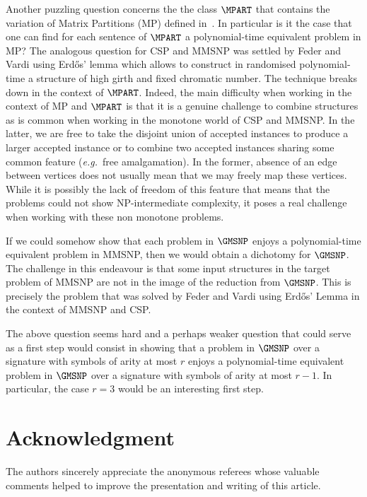 \documentclass{lmcs}
\def\eg{{\em e.g.}}
\begin{document}
Another puzzling question concerns the the class $\MPART$ that contains the variation of Matrix Partitions (MP) defined in~\cite{barsukovkante}.
%
In particular is it the case that one can find for each sentence of $\MPART$ a polynomial-time equivalent problem in MP?
%
The analogous question for CSP and MMSNP was settled by Feder and Vardi using Erd\H{o}s' lemma which allows to construct in randomised polynomial-time a structure of high girth and fixed chromatic number. 
%
The technique breaks down in the context of $\MPART$.
%
Indeed, the main difficulty when working in the context of MP and $\MPART$ is that it is a genuine challenge to combine structures as is common when working in the monotone world of CSP and MMSNP. 
%
In the latter, we are free to take the disjoint union of accepted instances to produce a larger accepted instance or to combine two accepted instances sharing some common feature (\eg~free amalgamation). 
%
In the former, absence of an edge between vertices does not usually mean that we may freely map these vertices.
%
While it is possibly the lack of freedom of this feature that means that the problems could not show NP-intermediate complexity, it poses a real challenge when working with these non monotone problems.

If we could somehow show that each problem in  $\GMSNP$ enjoys a polynomial-time equivalent problem in MMSNP, then we would obtain a dichotomy for $\GMSNP$.
%
The challenge in this endeavour is that some input structures in the target problem of MMSNP are not in the image of the reduction from $\GMSNP$. 
%
This is precisely the problem that was solved by Feder and Vardi using Erd\H{o}s' Lemma in the context of MMSNP and CSP.  

The above question seems hard and a perhaps weaker question that could serve as a first step would consist in showing that a problem in $\GMSNP$ over a signature with symbols of arity at most $r$ enjoys a polynomial-time equivalent problem in $\GMSNP$ over a signature with symbols of arity at most $r-1$. 
%
In particular, the case $r=3$ would be an interesting first step. 



\section*{Acknowledgment}
  \noindent The authors sincerely appreciate the anonymous referees whose valuable comments helped to improve the presentation and writing of this article.




%
%
%


%
\end{document}

